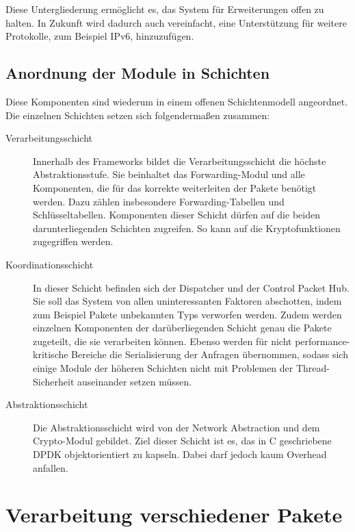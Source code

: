 \documentclass[a4paper, 11pt, ngerman, fleqn]{article}
\begin{document}
Diese Untergliederung ermöglicht es, das System für Erweiterungen offen zu halten.
In Zukunft wird dadurch auch vereinfacht, eine Unterstützung für weitere Protokolle, zum Beispiel IPv6, hinzuzufügen.

\subsection{Anordnung der Module in Schichten}
Diese Komponenten sind wiederum in einem offenen Schichtenmodell angeordnet.
Die einzelnen Schichten setzen sich folgendermaßen zusammen:

\begin{description}
	\item[Verarbeitungsschicht]
	Innerhalb des Frameworks bildet die Verarbeitungsschicht die höchste Abstraktionsstufe.
	Sie beinhaltet das Forwarding-Modul und alle Komponenten, die für das korrekte weiterleiten der Pakete benötigt werden. 
	Dazu zählen insbesondere Forwarding-Tabellen und Schlüsseltabellen.
	Komponenten dieser Schicht dürfen auf die beiden darunterliegenden Schichten zugreifen.
	So kann auf die Kryptofunktionen zugegriffen werden.
	
	\item[Koordinationsschicht]
	In dieser Schicht befinden sich der Dispatcher und der Control Packet Hub. 
	Sie soll das System von allen uninteressanten Faktoren abschotten, indem zum Beispiel Pakete unbekannten Typs verworfen werden.
	Zudem werden einzelnen Komponenten der darüberliegenden Schicht genau die Pakete zugeteilt, die sie verarbeiten können.
	Ebenso werden für nicht performance-kritische Bereiche die Serialisierung der Anfragen übernommen, sodass sich einige Module der höheren Schichten nicht mit Problemen der Thread-Sicherheit auseinander setzen müssen.
		
	
	\item[Abstraktionsschicht]
	Die Abstraktionsschicht wird von der Network Abstraction und dem Crypto-Modul gebildet.
	Ziel dieser Schicht ist es, das in C geschriebene DPDK objektorientiert zu kapseln. 
	Dabei darf jedoch kaum Overhead anfallen.
\end{description}

\clearpage


\section{Verarbeitung verschiedener Pakete}
\end{document}
